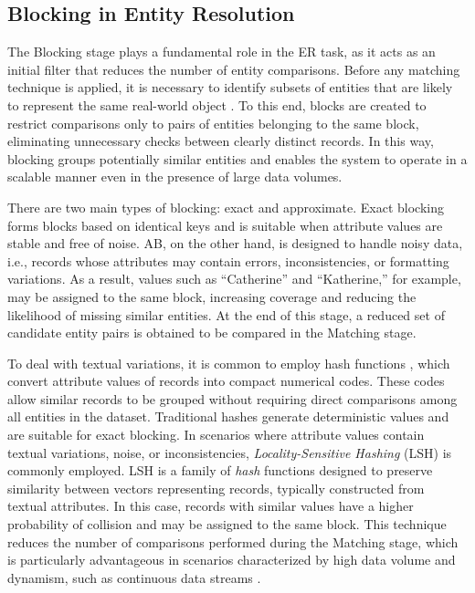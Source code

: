 \documentclass{ieeeaccess}
\begin{document}
\subsection{Blocking in Entity Resolution}
The Blocking stage plays a fundamental role in the ER task, as it acts as an initial filter that reduces the number of entity comparisons. Before any matching technique is applied, it is necessary to identify subsets of entities that are likely to represent the same real-world object \cite{christen2012}. To this end, blocks are created to restrict comparisons only to pairs of entities belonging to the same block, eliminating unnecessary checks between clearly distinct records. In this way, blocking groups potentially similar entities and enables the system to operate in a scalable manner even in the presence of large data volumes.

There are two main types of blocking: exact and approximate. Exact blocking forms blocks based on identical keys and is suitable when attribute values are stable and free of noise. AB, on the other hand, is designed to handle noisy data, i.e., records whose attributes may contain errors, inconsistencies, or formatting variations. As a result, values such as ``Catherine'' and ``Katherine,'' for example, may be assigned to the same block, increasing coverage and reducing the likelihood of missing similar entities. At the end of this stage, a reduced set of candidate entity pairs is obtained to be compared in the Matching stage.

To deal with textual variations, it is common to employ hash functions \cite{10.1145/3297280.3299730}, which convert attribute values of records into compact numerical codes. These codes allow similar records to be grouped without requiring direct comparisons among all entities in the dataset. Traditional hashes generate deterministic values and are suitable for exact blocking. In scenarios where attribute values contain textual variations, noise, or inconsistencies, \textit{Locality-Sensitive Hashing} (LSH) is commonly employed. LSH is a family of \textit{hash} functions designed to preserve similarity between vectors representing records, typically constructed from textual attributes. In this case, records with similar values have a higher probability of collision and may be assigned to the same block. This technique reduces the number of comparisons performed during the Matching stage, which is particularly advantageous in scenarios characterized by high data volume and dynamism, such as continuous data streams \cite{10.1145/997817.997857}.
\end{document}
